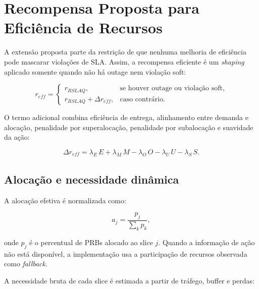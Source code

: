 \documentclass[10pt,a4paper]{IEEEtran}
\begin{document}
\section{Recompensa Proposta para Efici\^{e}ncia de Recursos}
\label{sec:reward_eff}

A extens\~{a}o proposta parte da restri\c{c}\~{a}o de que
nenhuma melhoria de efici\^{e}ncia pode mascarar
viola\c{c}\~{o}es de SLA. Assim, a recompensa eficiente
\'{e} um \emph{shaping} aplicado somente quando n\~{a}o h\'{a}
outage nem viola\c{c}\~{a}o soft:

\begin{equation}
r_{\textit{eff}} =
\begin{cases}
r_{\textit{RSLAQ}}, & \text{se houver outage ou viola\c{c}\~{a}o soft},\\[4pt]
r_{\textit{RSLAQ}} + \Delta r_{\textit{eff}}, & \text{caso contr\'{a}rio}.
\end{cases}
\label{eq:reff}
\end{equation}

O termo adicional combina efici\^{e}ncia de entrega,
alinhamento entre demanda e aloca\c{c}\~{a}o, penalidade por
superaloca\c{c}\~{a}o, penalidade por subaloca\c{c}\~{a}o
e suavidade da a\c{c}\~{a}o:

\begin{equation}
\Delta r_{\textit{eff}} =
\lambda_E\,E + \lambda_M\,M
- \lambda_O\,O - \lambda_U\,U - \lambda_S\,S.
\label{eq:delta_reff}
\end{equation}

\subsection{Aloca\c{c}\~{a}o e necessidade din\^{a}mica}

A aloca\c{c}\~{a}o efetiva \'{e} normalizada como:

\begin{equation}
a_j = \frac{p_j}{\sum_k p_k},
\label{eq:alloc_share}
\end{equation}

onde $p_j$ \'{e} o percentual de PRBs alocado ao slice $j$.
Quando a informa\c{c}\~{a}o de a\c{c}\~{a}o n\~{a}o est\'{a}
dispon\'{i}vel, a implementa\c{c}\~{a}o usa a participa\c{c}\~{a}o
de recursos observada como \emph{fallback}.

A necessidade bruta de cada slice \'{e} estimada a partir de
tr\'{a}fego, buffer e perdas:
\end{document}
